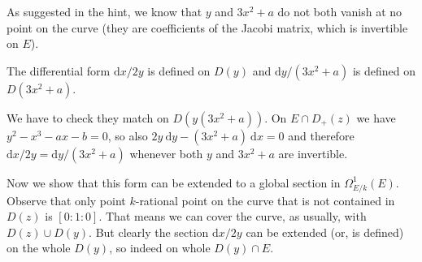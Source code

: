 \newcommand{\sheet}{4}




\maketitle{}

\begin{exercise}{1}
    As suggested in the hint, we know that $y$ and $3x^2 + a$ do not both vanish
    at no point on the curve (they are coefficients of the Jacobi matrix, which
    is invertible on $E$).

    The differential form $\mathrm{d}x / 2y$ is defined on $D(y)$ and
    $\mathrm{d}y / (3 x^2 + a)$ is defined on $D(3 x^2 + a)$.

    We have to check they match on $D(y (3 x^2 + a))$. On $E \cap D_+(z)$ we
    have $y^2 - x^3 - a x - b = 0$, so also $2 y\ \mathrm{d} y - (3 x^2 + a)\ \mathrm{d} x
    = 0$ and therefore $\mathrm{d}x / 2y = \mathrm{d}y / (3 x^2 + a)$ whenever
    both $y$ and $3x^2 + a$ are invertible.

    Now we show that this form can be extended to a global section in
    $\Omega^1_{E / k}(E)$.
    Observe that only point $k$-rational point on the curve that is not
    contained in $D(z)$ is $[0:1:0]$. That means we can cover the curve, as
    usually, with $D(z) \cup D(y)$. But clearly the section $\mathrm{d}x / 2y$
    can be extended (or, is defined) on the whole $D(y)$, so indeed on whole
    $D(y) \cap E$.
\end{exercise}



